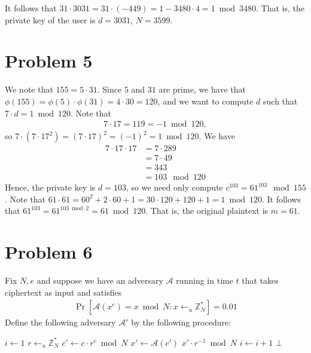 \documentclass[12pt]{article}
\numberwithin{equation}{section}
\theoremstyle{plain}
\DeclareMathOperator*{\prob}{Pr}
\newcommand{\adv}{\mathcal{A}}
\newcommand{\advv}{\mathcal{A}'}
\begin{document}
It follows that $31 \cdot 3031 = 31 \cdot (-449) = 1 - 3480 \cdot 4 = 1 \bmod 3480$.
That is, the private key of the user is $d=3031$, $N=3599$.


\section*{Problem 5}

We note that $155 = 5 \cdot 31$.
Since $5$ and $31$ are prime,
we have that $\phi(155) = \phi(5) \cdot \phi(31) = 4 \cdot 30 = 120$,
and we want to compute $d$ such that $7 \cdot d = 1 \bmod 120$.
Note that
\begin{gather*}
    7 \cdot 17 = 119 = -1 \bmod 120,
\end{gather*}
so $7 \cdot (7 \cdot 17^2) = (7 \cdot 17)^2 = (-1)^2 = 1 \bmod 120$.
We have
\begin{align*}
    7 \cdot 17 \cdot 17
        &= 7 \cdot 289\\
        &= 7 \cdot 49\\
        &= 343\\
        &= 103 \mod 120
\end{align*}
Hence, the private key is $d = 103$, so we need only compute $c^{103} = 61^{103} \mod 155$.
Note that $61 \cdot 61 = 60^2 + 2 \cdot 60 + 1 = 30 \cdot 120 + 120 + 1 = 1 \bmod 120$.
It follows that $61^{103} = 61^{103 \bmod 2} = 61 \bmod 120$.
That is, the original plaintext is $m = 61$.

\section*{Problem 6}

Fix $N, e$ and suppose we have an adversary $\adv$ running in time $t$ that takes ciphertext as input and satisfies
\begin{gather*}
    \prob[\adv(x^e) = x \bmod N : x \gets_u \mathbb{Z}^*_N] = 0.01
\end{gather*}
Define the following adversary $\advv$ by the following procedure:
\begin{algorithm}[H]
\begin{algorithmic}[1]
\Procedure{$\advv$}{c}
    \State $i \gets 1$
        \State $r \gets_u \mathbb{Z}^*_N$\label{alg:sample}
        \State $c' \gets c \cdot r^e \bmod N$\label{alg:uniform}
        \State $x' \gets \adv(c')$\label{alg:subroutine}
        \label{alg:verify}
            \State \Return $x' \cdot r^{-1} \bmod N$\label{alg:inverse}
        \EndIf
        \State $i \gets i+1$\label{alg:update}
    \EndWhile
    \State \Return $\bot$
\EndProcedure
\end{algorithmic}
\end{algorithm}
\end{document}
